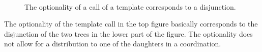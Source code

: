 \begin{figure}
 \raisebox{2cm}{\scalebox{.8}{$\equiv$}} \\

\hfill{}\hfill \raisebox{2cm}{\scalebox{.8}{$\vee$}} \hfill
{}\hfill\mbox{}
\caption{The optionality of a call of a template corresponds to a disjunction.}\label{fig-optionality-coordination}
\end{figure}
The optionality of the template call in the top figure basically corresponds to the disjunction of
the two trees in the lower part of the figure. The optionality does not allow for a distribution to one of the daughters in a coordination.

